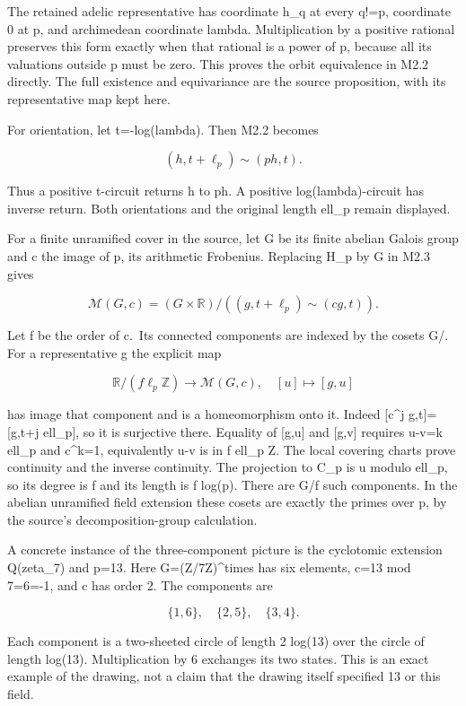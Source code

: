 \documentclass[
]{article}
\begin{document}
The retained adelic representative has coordinate h\_q at every q!=p,
coordinate 0 at p, and archimedean coordinate lambda. Multiplication by
a positive rational preserves this form exactly when that rational is a
power of p, because all its valuations outside p must be zero. This
proves the orbit equivalence in M2.2 directly. The full existence and
equivariance are the source proposition, with its representative map
kept here.

For orientation, let t=-log(lambda). Then M2.2 becomes

\[
(h,t+\ell_p)\sim(ph,t).
\tag{M2.3}
\]

Thus a positive t-circuit returns h to ph. A positive
log(lambda)-circuit has inverse return. Both orientations and the
original length ell\_p remain displayed.

For a finite unramified cover in the source, let G be its finite abelian
Galois group and c the image of p, its arithmetic Frobenius. Replacing
H\_p by G in M2.3 gives

\[
\mathcal M(G,c)= (G\times\mathbb R)/((g,t+\ell_p)\sim(cg,t)).
\tag{M2.4}
\]

Let f be the order of c.~Its connected components are indexed by the
cosets G/. For a representative g the explicit map

\[
\mathbb R/(f\ell_p\mathbb Z)\longrightarrow\mathcal M(G,c),
\quad [u]\longmapsto[g,u]
\tag{M2.5}
\]

has image that component and is a homeomorphism onto it. Indeed
{[}c\^{}j g,t{]}={[}g,t+j ell\_p{]}, so it is surjective there. Equality
of {[}g,u{]} and {[}g,v{]} requires u-v=k ell\_p and c\^{}k=1,
equivalently u-v is in f ell\_p Z. The local covering charts prove
continuity and the inverse continuity. The projection to C\_p is u
modulo ell\_p, so its degree is f and its length is f log(p). There are
\textbar G\textbar/f such components. In the abelian unramified field
extension these cosets are exactly the primes over p, by the source's
decomposition-group calculation.

A concrete instance of the three-component picture is the cyclotomic
extension Q(zeta\_7) and p=13. Here G=(Z/7Z)\^{}times has six elements,
c=13 mod 7=6=-1, and c has order 2. The components are

\[
\{1,6\},\quad\{2,5\},\quad\{3,4\}.
\tag{M2.6}
\]

Each component is a two-sheeted circle of length 2 log(13) over the
circle of length log(13). Multiplication by 6 exchanges its two states.
This is an exact example of the drawing, not a claim that the drawing
itself specified 13 or this field.
\end{document}
